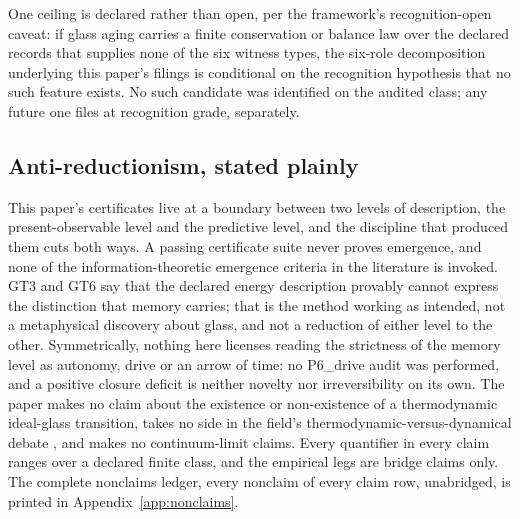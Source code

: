 One ceiling is declared rather than open, per the framework's recognition-open caveat: if glass
aging carries a finite conservation or balance law over the declared records that supplies none of
the six witness types, the six-role decomposition underlying this paper's filings is conditional
on the recognition hypothesis that no such feature exists. No such candidate was identified on the
audited class; any future one files at recognition grade, separately.

\subsection{Anti-reductionism, stated plainly}

This paper's certificates live at a boundary between two levels of description, the
present-observable level and the predictive level, and the discipline that produced them cuts both
ways. A passing certificate suite never proves emergence, and none of the information-theoretic
emergence criteria in the literature \cite{hoel-2013,rosas-2020} is invoked. GT3 and GT6 say that
the declared energy description provably cannot express the distinction that memory carries;
that is the method working as intended, not a metaphysical discovery about glass, and not a
reduction of either level to the other. Symmetrically, nothing here licenses reading the
strictness of the memory level as autonomy, drive or an arrow of time: no P6\_drive audit was
performed, and a positive closure deficit is neither novelty nor irreversibility on its own. The
paper makes no claim about the existence or non-existence of a thermodynamic ideal-glass
transition, takes no side in the field's thermodynamic-versus-dynamical debate
\cite{biroli-garrahan-2013}, and makes no continuum-limit claims. Every quantifier in every claim
ranges over a declared finite class, and the empirical legs are bridge claims only. The complete
nonclaims ledger, every nonclaim of every claim row, unabridged, is printed in
Appendix~\ref{app:nonclaims}.
